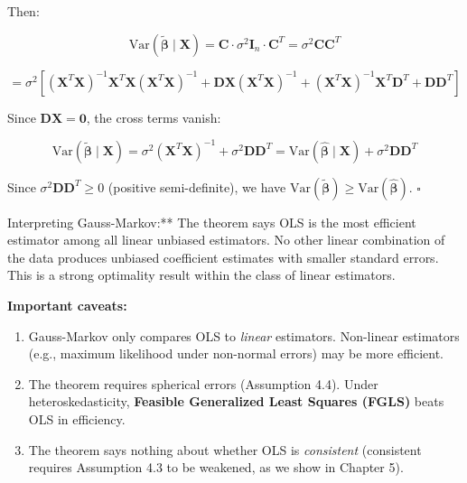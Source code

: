 Then:

\[
\text{Var}(\tilde{\boldsymbol{\beta}} \mid \mathbf{X}) = \mathbf{C} \cdot \sigma^2 \mathbf{I}_n \cdot \mathbf{C}^T = \sigma^2 \mathbf{C}\mathbf{C}^T
\]

\[
= \sigma^2 \left[(\mathbf{X}^T\mathbf{X})^{-1}\mathbf{X}^T\mathbf{X}(\mathbf{X}^T\mathbf{X})^{-1} + \mathbf{D}\mathbf{X}(\mathbf{X}^T\mathbf{X})^{-1} + (\mathbf{X}^T\mathbf{X})^{-1}\mathbf{X}^T\mathbf{D}^T + \mathbf{D}\mathbf{D}^T\right]
\]

Since $\mathbf{D}\mathbf{X} = \mathbf{0}$, the cross terms vanish:

\[
\text{Var}(\tilde{\boldsymbol{\beta}} \mid \mathbf{X}) = \sigma^2 (\mathbf{X}^T\mathbf{X})^{-1} + \sigma^2 \mathbf{D}\mathbf{D}^T = \text{Var}(\hat{\boldsymbol{\beta}} \mid \mathbf{X}) + \sigma^2 \mathbf{D}\mathbf{D}^T
\]

Since $\sigma^2 \mathbf{D}\mathbf{D}^T \geq 0$ (positive semi-definite), we have $\text{Var}(\tilde{\boldsymbol{\beta}}) \geq \text{Var}(\hat{\boldsymbol{\beta}})$. $\square$

\begin{keybox}{Interpreting Gauss-Markov:** The theorem says OLS is the most efficient estimator among all linear unbiased estimators. No other linear combination of the data produces unbiased coefficient estimates with smaller standard errors. This is a strong optimality result within the class of linear estimators.}
\end{keybox}

\textbf{Important caveats:}
\begin{enumerate}
\item Gauss-Markov only compares OLS to \textit{linear} estimators. Non-linear estimators (e.g., maximum likelihood under non-normal errors) may be more efficient.
\item The theorem requires spherical errors (Assumption 4.4). Under heteroskedasticity, \textbf{Feasible Generalized Least Squares (FGLS)} beats OLS in efficiency.
\item The theorem says nothing about whether OLS is \textit{consistent} (consistent requires Assumption 4.3 to be weakened, as we show in Chapter 5).
\end{enumerate}

